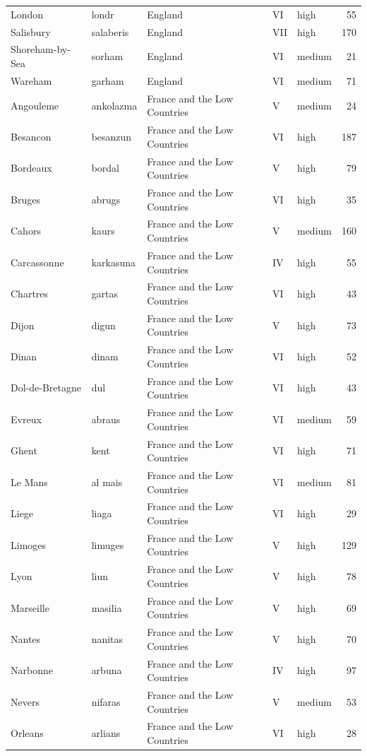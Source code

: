 \documentclass[11pt,a4paper]{article}
\begin{document}
{\begin{longtable}{p{4.6cm}p{3.0cm}p{3.6cm}llr}
London & londr & England & VI & high & 55\\
Salisbury & salaberis & England & VII & high & 170\\
Shoreham-by-Sea & sorham & England & VI & medium & 21\\
Wareham & garham & England & VI & medium & 71\\
Angouleme & ankolazma & France and the Low Countries & V & medium & 24\\
Besancon & besanzun & France and the Low Countries & VI & high & 187\\
Bordeaux & bordal & France and the Low Countries & V & high & 79\\
Bruges & abrugs & France and the Low Countries & VI & high & 35\\
Cahors & kaurs & France and the Low Countries & V & medium & 160\\
Carcassonne & karkasuna & France and the Low Countries & IV & high & 55\\
Chartres & gartas & France and the Low Countries & VI & high & 43\\
Dijon & digun & France and the Low Countries & V & high & 73\\
Dinan & dinam & France and the Low Countries & VI & high & 52\\
Dol-de-Bretagne & dul & France and the Low Countries & VI & high & 43\\
Evreux & abraus & France and the Low Countries & VI & medium & 59\\
Ghent & kent & France and the Low Countries & VI & high & 71\\
Le Mans & al mais & France and the Low Countries & VI & medium & 81\\
Liege & liaga & France and the Low Countries & VI & high & 29\\
Limoges & limuges & France and the Low Countries & V & high & 129\\
Lyon & liun & France and the Low Countries & V & high & 78\\
Marseille & masilia & France and the Low Countries & V & high & 69\\
Nantes & nanitas & France and the Low Countries & V & high & 70\\
Narbonne & arbuna & France and the Low Countries & IV & high & 97\\
Nevers & nifaras & France and the Low Countries & V & medium & 53\\
Orleans & arlians & France and the Low Countries & VI & high & 28\\

\end{longtable}}
\end{document}
